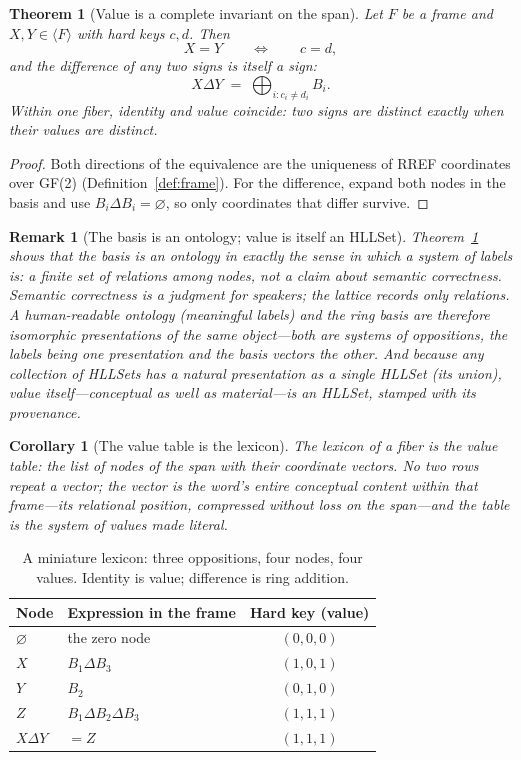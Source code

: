 \documentclass[11pt,a4paper]{article}
\newtheorem{theorem}[principle]{Theorem}
\newtheorem{corollary}[principle]{Corollary}
\newtheorem{remark}[principle]{Remark}
\theoremstyle{remark}
\newcommand{\xor}{\ensuremath{\Delta}}                   %
\newcommand{\spanof}[1]{\ensuremath{\langle #1\rangle}}  %
\begin{document}
\begin{theorem}[Value is a complete invariant on the span]
\label{thm:complete}
Let $F$ be a frame and $X,Y \in \spanof{F}$ with hard keys $c,d$. Then
\[
  X = Y \qquad\Longleftrightarrow\qquad c = d,
\]
and the difference of any two signs is itself a sign:
\[
  X \xor Y \;=\; \bigoplus_{i : c_i \neq d_i} B_i .
\]
Within one fiber, identity and value coincide: two signs are distinct exactly
when their values are distinct.
\end{theorem}

\begin{proof}
Both directions of the equivalence are the uniqueness of RREF coordinates over
GF(2) (Definition~\ref{def:frame}). For the difference, expand both nodes in
the basis and use $B_i \xor B_i = \varnothing$, so only coordinates that
differ survive.
\end{proof}

\begin{remark}[The basis is an ontology; value is itself an HLLSet]
\label{rem:ontology}
Theorem~\ref{thm:complete} shows that the basis is an \emph{ontology} in
exactly the sense in which a system of labels is: a finite set of relations
among nodes, not a claim about semantic correctness. Semantic correctness is
a judgment for speakers; the lattice records only relations. A
human-readable ontology (meaningful labels) and the ring basis are therefore
isomorphic presentations of the same object---both are systems of
oppositions, the labels being one presentation and the basis vectors the
other. And because any collection of HLLSets has a natural presentation as a
single HLLSet (its union), value itself---conceptual as well as material---is
an HLLSet, stamped with its provenance.
\end{remark}

\begin{corollary}[The value table is the lexicon]
\label{cor:lexicon}
The lexicon of a fiber is the value table: the list of nodes of the span with
their coordinate vectors. No two rows repeat a vector; the vector is the
word's entire conceptual content \emph{within that frame}---its relational
position, compressed without loss on the span---and the table is the system
of values made literal.
\end{corollary}

\begin{table}[htbp]
\centering
\renewcommand{\arraystretch}{1.2}
\begin{tabular}{@{}llc@{}}
\toprule
Node & Expression in the frame & Hard key (value) \\
\midrule
$\varnothing$ & the zero node & $(0,0,0)$ \\
$X$ & $B_1 \xor B_3$ & $(1,0,1)$ \\
$Y$ & $B_2$ & $(0,1,0)$ \\
$Z$ & $B_1 \xor B_2 \xor B_3$ & $(1,1,1)$ \\
$X \xor Y$ & $= Z$ & $(1,1,1)$ \\
\bottomrule
\end{tabular}
\caption{A miniature lexicon: three oppositions, four nodes, four values.
Identity is value; difference is ring addition.}
\label{tab:lexicon}
\end{table}
\end{document}
